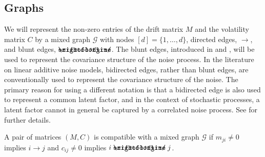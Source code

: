 \documentclass[10pt,twoside,a4paper]{amsart}
\DeclareRobustCommand{\unEdge}{%
	\mathrel{%
		\text{%
			\ooalign{$\rightfootline$\cr\reflectbox{$\rightfootline$}\cr}%
		}%
	}%
}
\begin{document}
\subsection{Graphs} \label{sec:graph}
We will represent the non-zero entries of the drift matrix
$M$ and the volatility matrix $C$ by a mixed graph $\mathcal{G}$ with nodes $[d]
= \{1, \ldots, d\}$, directed edges, $\rightarrow$, and blunt edges, $\unEdge$.
The blunt edges, introduced in \cite{varando2020} and \cite{Mogensen:2022}, will be
used to represent the covariance structure of the noise process. In the
literature on linear additive noise models, bidirected edges, rather than blunt
edges, are conventionally used to represent the covariance structure of the
noise. The primary reason for using a different notation is that a
bidirected edge is also used to represent a common latent factor, and in the
context of stochastic processes, a latent factor cannot in general be
captured by a correlated noise process. See \cite{Mogensen:2022} for further
details. 

\begin{definition} \label{dfn:graph}
    A pair of matrices $(M, C)$ is
    compatible with a mixed graph $\mathcal{G}$ if
    $m_{ji} \neq 0$ implies $i \rightarrow j$ and $c_{ij} \neq 0$ implies
    $i \unEdge j$.
\end{definition}
\end{document}
